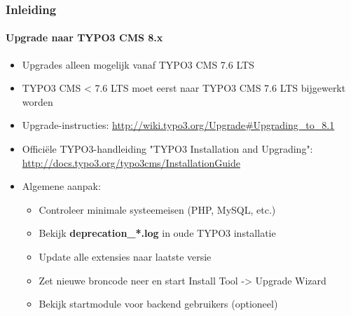 \begin{frame}[fragile]
	\frametitle{Inleiding}
	\framesubtitle{Upgrade naar TYPO3 CMS 8.x}

	\begin{itemize}
		\item Upgrades alleen mogelijk vanaf TYPO3 CMS 7.6 LTS
		\item TYPO3 CMS < 7.6 LTS moet eerst naar TYPO3 CMS 7.6 LTS bijgewerkt worden
	\end{itemize}

	\begin{itemize}

		\item Upgrade-instructies:\newline
			\smaller\url{http://wiki.typo3.org/Upgrade#Upgrading_to_8.1}\normalsize
		\item Officiële TYPO3-handleiding "TYPO3 Installation and Upgrading":
			\smaller\url{http://docs.typo3.org/typo3cms/InstallationGuide}\normalsize
		\item Algemene aanpak:
			\begin{itemize}
				\item Controleer minimale systeemeisen \small(PHP, MySQL, etc.)
				\item Bekijk \textbf{deprecation\_*.log} in oude TYPO3 installatie
				\item Update alle extensies naar laatste versie
				\item Zet nieuwe broncode neer en start Install Tool -> Upgrade Wizard
				\item Bekijk startmodule voor backend gebruikers (optioneel)
			\end{itemize}
	\end{itemize}

\end{frame}


